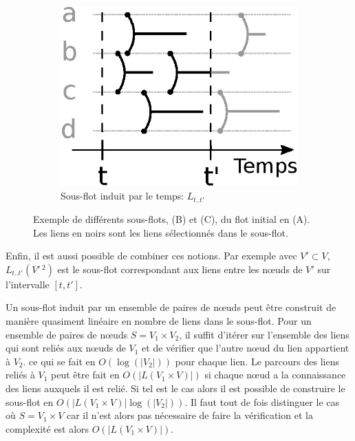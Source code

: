 \begin{figure}[]
\begin{subfigure}{0.25\linewidth}
		\includegraphics[width=\linewidth]{img/Intro/sous_flots2.eps}\hfill
		\caption{Sous-flot induit par le temps:  $L_{t..t'}$}
		\label{fig:exemple_sous_flot2}	
	\end{subfigure}
	\caption{Exemple de différents sous-flots, (B) et (C), du flot initial en (A). Les liens en noirs sont les liens sélectionnés dans le sous-flot. }
\label{fig:exemple_sous_flot}
\end{figure}
Enfin, il est aussi possible de combiner ces notions.
Par exemple avec $V' \subset V$, $L_{t..t'}(V'\,^2)$ est le sous-flot correspondant aux liens entre les n\oe{}uds de $V'$ sur l'intervalle $[t, t']$.

\bigskip

Un sous-flot induit par un ensemble de paires de n\oe{}uds peut être construit de manière quasiment linéaire en nombre de liens dans le sous-flot.
Pour un ensemble de paires de n\oe{}uds $S= V_1 \times V_2$, il suffit d'itérer sur l'ensemble des liens qui sont reliés aux n\oe{}uds de $V_1$ et de vérifier que l'autre n\oe{}ud du lien appartient à $V_2$. ce qui se fait en $O(\log(|V_2|))$ pour chaque lien.
Le parcours des liens reliés à $V_1$ peut être fait en $O(|L(V_1 \times V)|)$ si chaque n\oe{}ud a la connaissance des liens auxquels il est relié.
Si tel est le cas alors il est possible de construire le sous-flot en $O(|L(V_1\times V)|\log(|V_2|))$.
Il faut tout de fois distinguer le cas où $S= V_1 \times V$ car il n'est alors pas nécessaire de faire la vérification et la complexité est alors $O(|L(V_1\times V)|)$.

